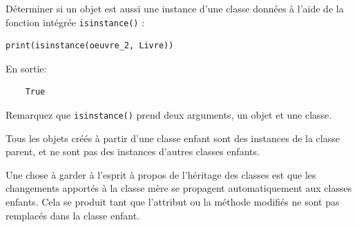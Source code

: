 \documentclass[a4paper,11pt]{book}
\begin{document}
Déterminer si un objet est aussi une instance d’une classe données à l’aide de la fonction intégrée \texttt{isinstance()} :
\begin{lstlisting}[caption=La fonction \texttt{isinstance()}]
print(isinstance(oeuvre_2, Livre))
\end{lstlisting}
\medskip

En sortie:
\begin{verbatim}
    True
\end{verbatim}
\medskip

Remarquez que \texttt{isinstance()} prend deux arguments, un objet et une classe.
\medskip

Tous les objets créés à partir d'une classe enfant sont des instances de la classe parent, et ne sont pas des instances d'autres classes enfants.
\medskip

Une chose à garder à l'esprit à propos de l'héritage des classes est que les changements apportés à la classe mère se propagent automatiquement aux classes enfants. Cela se produit tant que l'attribut ou la méthode modifiés ne sont pas remplacés dans la classe enfant.
\medskip
\end{document}
